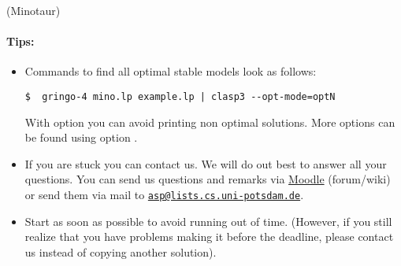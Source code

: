 \documentclass[a4paper,12pt]{article}
\begin{document}
\begin{PraktikumsAufgabe}{3}{(Minotaur)}
\paragraph{Tips:}
\begin{itemize}
\item Commands to find all optimal stable models look as follows:%
\vspace{-1.5mm}%
\begin{verbatim}
$  gringo-4 mino.lp example.lp | clasp3 --opt-mode=optN
\end{verbatim}
\vspace{-1mm}
With option  you can avoid printing non optimal solutions.
More  options can be found using option .
\item If you are stuck you can contact us. We will do out best to answer all your questions.
      You can send us questions and remarks via 
      \href{http://moodle.cs.uni-potsdam.de/course/view.php?id=39}{Moodle} (forum/wiki)
      or send them via mail to 
      \href{mailto:asp@lists.cs.uni-potsdam.de}{\texttt{asp@lists.cs.uni-potsdam.de}}.
\item Start as soon as possible to avoid running out of time.
      (However, if you still realize that you have problems making it before the deadline,
       please contact us instead of copying another solution).
\end{itemize}

\end{PraktikumsAufgabe}
\end{document}
